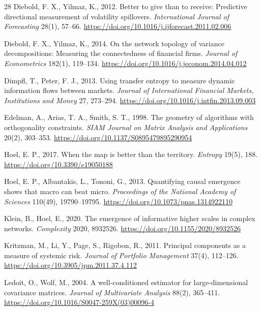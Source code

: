 \documentclass[review,12pt,authoryear]{elsarticle}
\begin{document}
\begin{thebibliography}{28}
Diebold, F. X., Yilmaz, K., 2012.
\newblock Better to give than to receive: Predictive directional measurement of volatility spillovers.
\newblock \emph{International Journal of Forecasting} 28(1), 57--66. \url{https://doi.org/10.1016/j.ijforecast.2011.02.006}

Diebold, F. X., Yilmaz, K., 2014.
\newblock On the network topology of variance decompositions: Measuring the connectedness of financial firms.
\newblock \emph{Journal of Econometrics} 182(1), 119--134. \url{https://doi.org/10.1016/j.jeconom.2014.04.012}

Dimpfl, T., Peter, F. J., 2013.
\newblock Using transfer entropy to measure dynamic information flows between markets.
\newblock \emph{Journal of International Financial Markets, Institutions and Money} 27, 273--294. \url{https://doi.org/10.1016/j.intfin.2013.09.003}

Edelman, A., Arias, T. A., Smith, S. T., 1998.
\newblock The geometry of algorithms with orthogonality constraints.
\newblock \emph{SIAM Journal on Matrix Analysis and Applications} 20(2), 303--353. \url{https://doi.org/10.1137/S0895479895290954}

Hoel, E. P., 2017.
\newblock When the map is better than the territory.
\newblock \emph{Entropy} 19(5), 188. \url{https://doi.org/10.3390/e19050188}

Hoel, E. P., Albantakis, L., Tononi, G., 2013.
\newblock Quantifying causal emergence shows that macro can beat micro.
\newblock \emph{Proceedings of the National Academy of Sciences} 110(49), 19790--19795. \url{https://doi.org/10.1073/pnas.1314922110}

Klein, B., Hoel, E., 2020.
\newblock The emergence of informative higher scales in complex networks.
\newblock \emph{Complexity} 2020, 8932526. \url{https://doi.org/10.1155/2020/8932526}

Kritzman, M., Li, Y., Page, S., Rigobon, R., 2011.
\newblock Principal components as a measure of systemic risk.
\newblock \emph{Journal of Portfolio Management} 37(4), 112--126. \url{https://doi.org/10.3905/jpm.2011.37.4.112}

Ledoit, O., Wolf, M., 2004.
\newblock A well-conditioned estimator for large-dimensional covariance matrices.
\newblock \emph{Journal of Multivariate Analysis} 88(2), 365--411. \url{https://doi.org/10.1016/S0047-259X(03)00096-4}


\end{thebibliography}
\end{document}
